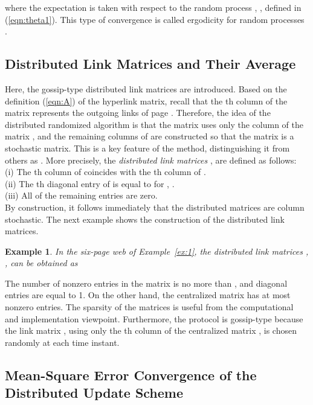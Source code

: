 \documentclass[11pt,draftcls,onecolumn]{IEEEtran}
\newtheorem{example}[theorem]{Example}
\newcommand{\End}{\hfill \mbox{}}
\begin{document}
where the expectation  is taken with respect to the random process
, , defined in (\ref{eqn:theta1}).
This type of convergence is called ergodicity for random processes \cite{PapPil:02}.

\subsection*{Distributed Link Matrices and Their Average}

Here, the gossip-type distributed link matrices are introduced.
Based on the definition (\ref{eqn:A}) of 
the hyperlink matrix, recall that the th column of the matrix  represents the outgoing links 
of page . Therefore, the idea of the distributed randomized algorithm is that the matrix  
uses only the column  of the matrix , and the remaining columns of  are constructed 
so that the matrix  is a stochastic matrix. 
This is a key feature of the method, distinguishing it from others as \cite{Nesterov:12,Necoara:13}. 
More precisely, the {\it distributed link matrices}
, are defined as follows: \\
(i) The th column of  coincides with the th column of . \\
(ii) The th diagonal entry of  is equal to  for 
, . \\
(iii) All of the remaining entries  are zero.\\
By construction, it follows immediately that the distributed matrices  are column stochastic. 
The next example shows the construction of the distributed link matrices.

\begin{example}\label{ex:3}\rm
In the six-page web of Example~\ref{ex:1}, 
the distributed link matrices , , can be obtained as


\End
\end{example}

\medskip
The number of nonzero entries in the matrix  is no more than , 
and  diagonal entries are equal to 1. On the other hand, the centralized matrix  
has at most  nonzero entries. The sparsity of the matrices  is useful 
from the computational and implementation viewpoint.
Furthermore, the protocol is gossip-type because 
the link matrix , using only the th column of the centralized matrix ,
is chosen randomly at each time instant. 



\subsection*{Mean-Square Error Convergence of the Distributed Update Scheme}
\end{document}
